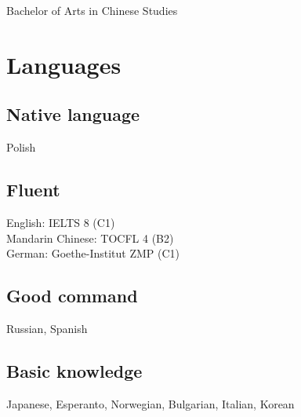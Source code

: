 \documentclass[10pt,a4paper]{article}
\begin{document}
\begin{minipage}[t]{0.3\textwidth}
  \small Bachelor of Arts in Chinese Studies
  
  \vspace{12pt}

  \section{Languages}

  \small
  \subsection{Native language} Polish \vspace{4pt}

  \subsection{Fluent}
  English: IELTS 8 (C1)\\ Mandarin Chinese: TOCFL 4 (B2)\\ German: Goethe-Institut ZMP (C1) \vspace{4pt}

  \subsection{Good command}
  Russian, Spanish \vspace{4pt}

  \subsection{Basic knowledge}
  Japanese, Esperanto, Norwegian, Bulgarian, Italian, Korean

\end{minipage}
\end{document}
